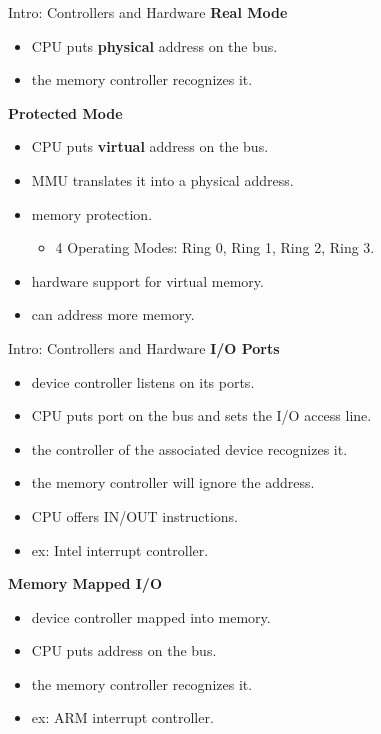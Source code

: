 \documentclass{workshop}
\begin{document}
\begin{frame}{Intro: Controllers and Hardware}
\textbf{Real Mode}\\
\begin{itemize}
  \item CPU puts \textbf{physical} address on the bus.
  \item the memory controller recognizes it.
\end{itemize}

\textbf{Protected Mode}\\
\begin{itemize}
  \item CPU puts \textbf{virtual} address on the bus.
  \item MMU translates it into a physical address.
  \item memory protection.
  \begin{itemize}
    \item 4 Operating Modes: Ring 0, Ring 1, Ring 2, Ring 3.
  \end{itemize}
  \item hardware support for virtual memory.
  \item can address more memory.
\end{itemize}
\end{frame}

\begin{frame}{Intro: Controllers and Hardware}
\textbf{I/O Ports}\\
\begin{itemize}
  \item device controller listens on its ports.
  \item CPU puts port on the bus and sets the I/O access line.
  \item the controller of the associated device recognizes it.
  \item the memory controller will ignore the address.
  \item CPU offers IN/OUT instructions.
  \item ex: Intel interrupt controller.
\end{itemize}

\textbf{Memory Mapped I/O}\\
\begin{itemize}
  \item device controller mapped into memory.
  \item CPU puts address on the bus.
  \item the memory controller recognizes it.
  \item ex: ARM interrupt controller.
\end{itemize}
\end{frame}
\end{document}
